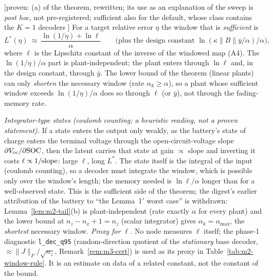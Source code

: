 \begin{corollary}\label{cor:m2-rule}
[proven: (a) of the theorem, rewritten; its use as an explanation of the sweep is \emph{post hoc}, not pre-registered;
sufficient also for the default, whose class contains the $K=1$ decoders ]
For a target relative error $\eta$ the window that is \emph{sufficient} is
\[
 L^*(\eta)\ \approx\ \frac{\ln(1/\eta)+\ln\ell}{\alpha}\qquad\text{(plus the design constant }\ln(\kappa\|B\|\bar y/\alpha)/\alpha\text{)},
\]
where $\ell$ is the Lipschitz constant of the inverse of the windowed map (A4). The $\ln(1/\eta)/\alpha$ part is
plant-independent; the plant enters through $\ln\ell$ and, in the design constant, through $\bar y$. The lower bound of
the theorem (linear plants) can only \emph{shorten} the necessary window (rate $\alpha_k\ge\alpha$), so a plant whose
sufficient window exceeds $\ln(1/\eta)/\alpha$ does so through $\ell$ (or $\bar y$), not through the fading-memory rate.
\end{corollary}
\emph{Integrator-type states (coulomb counting; a heuristic reading, not a proven statement).} If a state enters the output only weakly, as the battery's state of
charge enters the terminal voltage through the open-circuit-voltage slope $\partial V_{\rm oc}/\partial{\rm SOC}$, then
the latent carries that state at gain $\propto$ slope and inverting it costs $\ell\propto1/{\rm slope}$: large
$\ell$, long $L^*$. The state itself is the integral of the input (coulomb counting), so a decoder must integrate the
window, which is possible only over the window's length; the memory needed is $\ln\ell/\alpha$ longer than for a
well-observed state. This is the sufficient side of the theorem; the digest's earlier attribution of the battery to
``the Lemma~1$'$ worst case'' is withdrawn: Lemma~\ref{lem:m2-tail}(b) is plant-independent (rate exactly $\alpha$ for
every plant) and the lower bound at $n_z-n_x+1=n_z$ (scalar integrator) gives $\alpha_k=\alpha_{\max}$, the
\emph{shortest} necessary window. \emph{Proxy for $\ell$.} No node measures $\ell$ itself; the phase-1 diagnostic
\texttt{l\_dec\_q95} (random-direction quotient of the \emph{stationary} base decoder, $\approx\|J\|_F/\sqrt{n_z}$,
Remark~\ref{rem:m3-cert}) is used as its proxy in Table~\ref{tab:m2-window-rule}. It is an estimate on data of a
related constant, not the constant of the bound.

